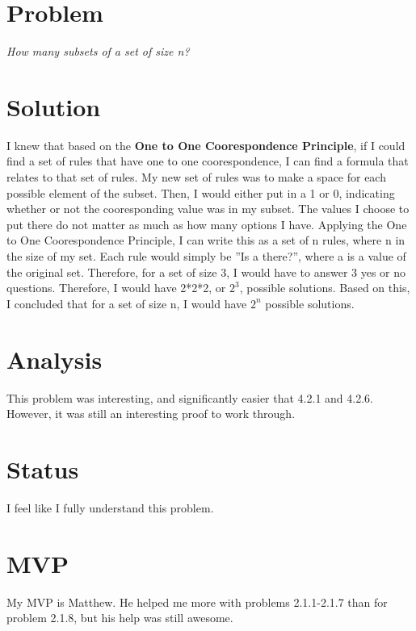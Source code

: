 \documentclass[11pt]{article} %
\newcommand\tab[1][1cm]{\hspace*{#1}}
\begin{document}
\newpage
\maketitle
\section* {Problem}
\textit{How many subsets of a set of size n?}

\section*{Solution}
\tab I knew that based on the \textbf{One to One Coorespondence Principle}, if I could find a set of rules that have one to one coorespondence, I can find a formula that relates to that set of rules. My new set of rules was to make a space for each possible element of the subset. Then, I would either put in a 1 or 0, indicating whether or not the cooresponding value was in my subset. The values I choose to put there do not matter as much as how many options I have. Applying the One to One Coorespondence Principle, I can write this as a set of n rules, where n in the size of my set. Each rule would simply be ''Is a there?'', where a is a value of the original set. Therefore, for a set of size 3, I would have to answer 3 yes or no questions. Therefore, I would have 2*2*2, or $2^3$, possible solutions. Based on this, I concluded that for a set of size n, I would have $2^n$ possible solutions. 
 
\section* {Analysis}
This problem was interesting, and significantly easier that 4.2.1 and 4.2.6. However, it was still an interesting proof to work through.

\section* {Status}
\tab I feel like I fully understand this problem.

\section* {MVP}
\tab My MVP is Matthew. He helped me more with problems 2.1.1-2.1.7 than for problem 2.1.8, but his help was still awesome. 
\end{document}
